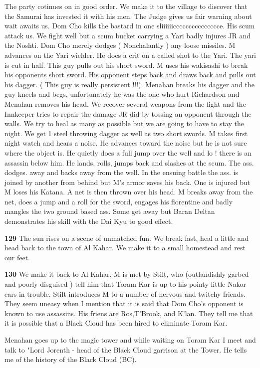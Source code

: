 \documentclass[10pt]{report}
\begin{document}
The party cotinues on in good order. We make it to the village to discover
that the Samurai has invested it with his men. The Judge gives us fair
warning about wait awaits us. Dom Cho kills the bastard in one
sliiiiiiccccccccccccccce. His scum attack us. We fight well but a scum
bucket carrying a Yari badly injures JR and the Noshti. Dom Cho merely
dodges ( Nonchalantly ) any loose missiles. M advances on the Yari
wielder. He does a crit on a called shot to the Yari. The yari is cut in
half. This guy pulls out his short sword. M uses his wakisashi to break
his opponents short sword. His opponent steps back and draws back and
pulls out his dagger. ( This guy is really persistent !!!). Menahan breaks
his dagger and the guy kneels and begs, unfortunately he was the one who
hurt Richardson and Menahan removes his head. We recover several weapons
from the fight and the Innkeeper tries to repair the damage JR did by
tossing an opponent through the walls. We try to heal as many as possible
but we are going to have to stay the night. We get 1 steel throwing dagger
as well as two short swords. M takes first night watch and hears a noise.
He advances toward the noise but he is not sure where the object is. He
quietly does a full jump over the well and lo ! there is an assassin below
him. He lands, rolls, jumps back and slashes at the scum. The ass. dodges.
away and backs away from the well. In the ensuing battle the ass. is
joined by another from behind but M's armor saves his back. One is injured
but M loses his Katana. A net is then thrown over his head. M breaks away
from the net, does a jump and a roll for the sword, engages his florentine
and badly mangles the two ground based ass. Some get away but Baran Deltan
demonstrates his skill with the Dai Kyu to good effect.

{\bf 129  }The sun rises on a scene of unmatched fun. We break fast, heal a
little and head back to the town of Al Kahar. We make it to a small
homestead and rest our feet.

{\bf 130  }We make it back to Al Kahar. M is met by Stilt, who (outlandishly
garbed and poorly disguised ) tell him that Toram Kar is up to his pointy
little Nakor ears in trouble. Stilt introduces M to a number of nervous
and twitchy friends. They seem uneasy when I mention that it is said that
Dom Cho's opponent is known to use assassins. His friens are Ros,T'Brook,
and K'lan. They tell me that it is possible that a Black Cloud has been
hired to eliminate Toram Kar.

Menahan goes up to the magic tower and while waiting on Toram Kar I meet
and talk to "Lord Jorenth - head of the Black Cloud garrison at the Tower.
He tells me of the history of the Black Cloud (BC).
\end{document}
